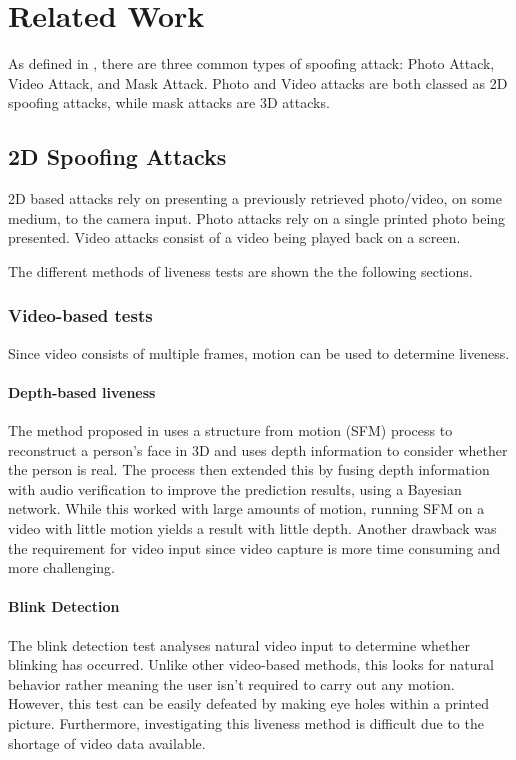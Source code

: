 \documentclass[12pt,a4paper]{article}
\begin{document}
\section{Related Work}
    As defined in \cite{FaceSpoofingAttacksStudy}, there are three common types of spoofing attack: Photo Attack, Video Attack, and Mask Attack.
    Photo and Video attacks are both classed as 2D spoofing attacks, while mask attacks are 3D attacks.

    \subsection{2D Spoofing Attacks}
        2D based attacks rely on presenting a previously retrieved photo/video, on some medium, to the camera input. Photo attacks rely on a single printed photo being presented. Video attacks consist of a video being played back on a screen. \cite{FaceSpoofingAttacksStudy}
        
        The different methods of liveness tests are shown the the following sections.

        \subsubsection{Video-based tests}
        Since video consists of multiple frames, motion can be used to determine liveness. 

        \paragraph{Depth-based liveness}

        The method proposed in \cite{SFMClassifier} uses a structure from motion (SFM) process to reconstruct a person's face in 3D and uses depth information to consider whether the person is real. The process then extended this by fusing depth information with audio verification to improve the prediction results, using a Bayesian network. \cite{SFMClassifier} While this worked with large amounts of motion, running SFM on a video with little motion yields a result with little depth. Another drawback was the requirement for video input since video capture is more time consuming and more challenging.
        
        \paragraph{Blink Detection}
        The blink detection test analyses natural video input to determine whether blinking has occurred. Unlike other video-based methods, this looks for natural behavior rather meaning the user isn't required to carry out any motion. \cite{BlinkDetectionLivenessTest} 
        However, this test can be easily defeated by making eye holes within a printed picture. 
        Furthermore, investigating this liveness method is difficult due to the shortage of video data available.
    
\end{document}
